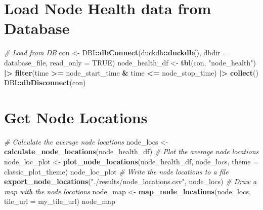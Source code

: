\documentclass[
]{book}
\newenvironment{Shaded}{\begin{snugshade}}{\end{snugshade}}
\newcommand{\AttributeTok}[1]{\textcolor[rgb]{0.13,0.29,0.53}{#1}}
\newcommand{\CommentTok}[1]{\textcolor[rgb]{0.56,0.35,0.01}{\textit{#1}}}
\newcommand{\ConstantTok}[1]{\textcolor[rgb]{0.56,0.35,0.01}{#1}}
\newcommand{\FunctionTok}[1]{\textcolor[rgb]{0.13,0.29,0.53}{\textbf{#1}}}
\newcommand{\NormalTok}[1]{#1}
\newcommand{\OtherTok}[1]{\textcolor[rgb]{0.56,0.35,0.01}{#1}}
\newcommand{\SpecialCharTok}[1]{\textcolor[rgb]{0.81,0.36,0.00}{\textbf{#1}}}
\newcommand{\StringTok}[1]{\textcolor[rgb]{0.31,0.60,0.02}{#1}}
\begin{document}
\section{Load Node Health data from Database}\label{load-node-health-data-from-database}

\begin{Shaded}
\begin{Highlighting}[]
\CommentTok{\# Load from DB}
\NormalTok{con }\OtherTok{\textless{}{-}}\NormalTok{ DBI}\SpecialCharTok{::}\FunctionTok{dbConnect}\NormalTok{(duckdb}\SpecialCharTok{::}\FunctionTok{duckdb}\NormalTok{(), }\AttributeTok{dbdir =}\NormalTok{ database\_file, }\AttributeTok{read\_only =} \ConstantTok{TRUE}\NormalTok{)}
\NormalTok{node\_health\_df }\OtherTok{\textless{}{-}} \FunctionTok{tbl}\NormalTok{(con, }\StringTok{"node\_health"}\NormalTok{) }\SpecialCharTok{|\textgreater{}}
  \FunctionTok{filter}\NormalTok{(time }\SpecialCharTok{\textgreater{}=}\NormalTok{ node\_start\_time }\SpecialCharTok{\&}\NormalTok{ time }\SpecialCharTok{\textless{}=}\NormalTok{ node\_stop\_time) }\SpecialCharTok{|\textgreater{}}
  \FunctionTok{collect}\NormalTok{()}
\NormalTok{DBI}\SpecialCharTok{::}\FunctionTok{dbDisconnect}\NormalTok{(con)}
\end{Highlighting}
\end{Shaded}

\section{Get Node Locations}\label{get-node-locations-2}

\begin{Shaded}
\begin{Highlighting}[]
\CommentTok{\# Calculate the average node locations}
\NormalTok{node\_locs }\OtherTok{\textless{}{-}} \FunctionTok{calculate\_node\_locations}\NormalTok{(node\_health\_df)}
\CommentTok{\# Plot the average node locations}
\NormalTok{node\_loc\_plot }\OtherTok{\textless{}{-}} \FunctionTok{plot\_node\_locations}\NormalTok{(node\_health\_df,}
\NormalTok{                                     node\_locs,}
                                     \AttributeTok{theme =}\NormalTok{ classic\_plot\_theme)}
\NormalTok{node\_loc\_plot}
\CommentTok{\# Write the node locations to a file}
\FunctionTok{export\_node\_locations}\NormalTok{(}\StringTok{"./results/node\_locations.csv"}\NormalTok{, node\_locs)}
\CommentTok{\# Draw a map with the node locations}
\NormalTok{node\_map }\OtherTok{\textless{}{-}} \FunctionTok{map\_node\_locations}\NormalTok{(node\_locs, }\AttributeTok{tile\_url =}\NormalTok{ my\_tile\_url)}
\NormalTok{node\_map}
\end{Highlighting}
\end{Shaded}
\end{document}

